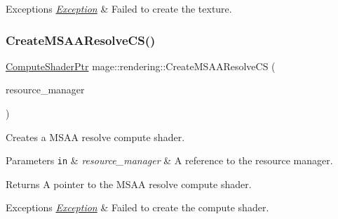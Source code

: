 \begin{DoxyExceptions}{Exceptions}
{\em \mbox{\hyperlink{classmage_1_1_exception}{Exception}}} & Failed to create the texture. \\
\hline
\end{DoxyExceptions}
\mbox{\label{namespacemage_1_1rendering_a0b3aa622ed9fb118712f9a885d45997d}} 
\subsubsection{\texorpdfstring{Create\+M\+S\+A\+A\+Resolve\+C\+S()}{CreateMSAAResolveCS()}}
{\footnotesize\ttfamily \mbox{\hyperlink{namespacemage_1_1rendering_ab3dc9f2114f2e9255b91d9c051da52ea}{Compute\+Shader\+Ptr}} mage\+::rendering\+::\+Create\+M\+S\+A\+A\+Resolve\+CS (\begin{DoxyParamCaption}\item[{\mbox{\hyperlink{classmage_1_1rendering_1_1_resource_manager}{Resource\+Manager}} \&}]{resource\+\_\+manager }\end{DoxyParamCaption})}

Creates a M\+S\+AA resolve compute shader.


\begin{DoxyParams}[1]{Parameters}
\mbox{\tt in}  & {\em resource\+\_\+manager} & A reference to the resource manager. \\
\hline
\end{DoxyParams}
\begin{DoxyReturn}{Returns}
A pointer to the M\+S\+AA resolve compute shader. 
\end{DoxyReturn}

\begin{DoxyExceptions}{Exceptions}
{\em \mbox{\hyperlink{classmage_1_1_exception}{Exception}}} & Failed to create the compute shader. \\
\hline
\end{DoxyExceptions}
\mbox{\label{namespacemage_1_1rendering_a379bf058f263791fb489c5c4cbea35e8}} 
